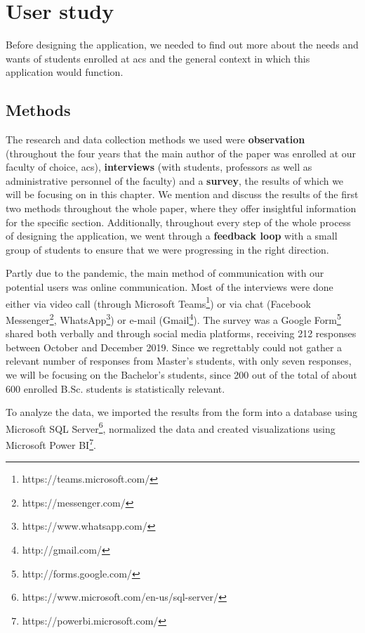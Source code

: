 \chapter{User study} \label{chapter3}

Before designing the application, we needed to find out more about the needs and wants of students enrolled at \acrshort{acs} and the general context in which this application would function.

\section{Methods} \label{3:methods}

The research and data collection methods we used were \textbf{observation} (throughout the four years that the main author of the paper was enrolled at our faculty of choice, \acrshort{acs}), \textbf{interviews} (with students, professors as well as administrative personnel of the faculty) and a \textbf{survey}, the results of which we will be focusing on in this chapter.  We mention and discuss the results of the first two methods throughout the whole paper, where they offer insightful information for the specific section. Additionally, throughout every step of the whole process of designing the application, we went through a \textbf{feedback loop} with a small group of students to ensure that we were progressing in the right direction.

Partly due to the pandemic, the main method of communication with our potential users was online communication. Most of the interviews were done either via video call (through Microsoft Teams\footnote{https://teams.microsoft.com/}) or via chat (Facebook Messenger\footnote{https://messenger.com/}, WhatsApp\footnote{https://www.whatsapp.com/}) or e-mail (Gmail\footnote{http://gmail.com/}). The survey was a Google Form\footnote{http://forms.google.com/} shared both verbally and through social media platforms, receiving 212 responses between October and December 2019. Since we regrettably could not gather a relevant number of responses from Master's students, with only seven responses, we will be focusing on the Bachelor's students, since 200 out of the total of about 600 enrolled B.Sc. students is statistically relevant.

To analyze the data, we imported the results from the form into a database using Microsoft SQL Server\footnote{https://www.microsoft.com/en-us/sql-server/}, normalized the data and created visualizations using Microsoft Power BI\footnote{https://powerbi.microsoft.com/}.

